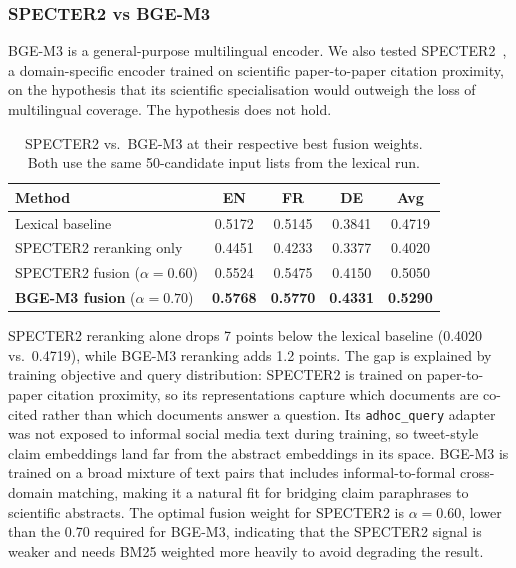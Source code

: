 \subsubsection{SPECTER2 vs BGE-M3}

BGE-M3 is a general-purpose multilingual encoder. We also tested SPECTER2~\cite{singh2022scirepeval}, a domain-specific encoder trained on scientific paper-to-paper citation proximity, on the hypothesis that its scientific specialisation would outweigh the loss of multilingual coverage. The hypothesis does not hold.

\begin{table}[!ht]
    \caption{SPECTER2 vs.\ BGE-M3 at their respective best fusion weights. Both use the same 50-candidate input lists from the lexical run.}
    \label{tab:specter-vs-bge}
    \centering
    \begin{tabular}{lcccc}
        \toprule
        Method & EN & FR & DE & Avg \\
        \midrule
        Lexical baseline                           & 0.5172 & 0.5145 & 0.3841 & 0.4719 \\
        SPECTER2 reranking only                    & 0.4451 & 0.4233 & 0.3377 & 0.4020 \\
        SPECTER2 fusion ($\alpha{=}0.60$)          & 0.5524 & 0.5475 & 0.4150 & 0.5050 \\
        \textbf{BGE-M3 fusion} ($\alpha{=}0.70$)   & \textbf{0.5768} & \textbf{0.5770} & \textbf{0.4331} & \textbf{0.5290} \\
        \bottomrule
    \end{tabular}
\end{table}

SPECTER2 reranking alone drops 7 points below the lexical baseline (0.4020 vs.\ 0.4719), while BGE-M3 reranking adds 1.2 points. The gap is explained by training objective and query distribution: SPECTER2 is trained on paper-to-paper citation proximity, so its representations capture which documents are co-cited rather than which documents answer a question. Its \texttt{adhoc\_query} adapter was not exposed to informal social media text during training, so tweet-style claim embeddings land far from the abstract embeddings in its space. BGE-M3 is trained on a broad mixture of text pairs that includes informal-to-formal cross-domain matching, making it a natural fit for bridging claim paraphrases to scientific abstracts. The optimal fusion weight for SPECTER2 is $\alpha{=}0.60$, lower than the 0.70 required for BGE-M3, indicating that the SPECTER2 signal is weaker and needs BM25 weighted more heavily to avoid degrading the result.


